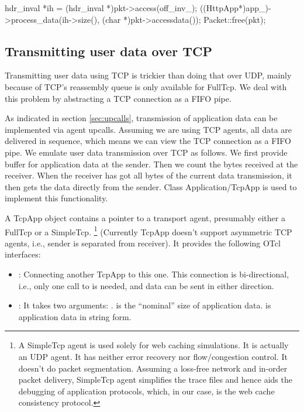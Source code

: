 \begin{program}
        hdr_inval *ih = (hdr_inval *)pkt->access(off_inv_);
        ((HttpApp*)app_)->process_data(ih->size(), (char *)pkt->accessdata());
        Packet::free(pkt);
\end{program}


\subsection{Transmitting user data over TCP}
\label{sec:webcache-tcpapp}

Transmitting user data using TCP is trickier than doing that over UDP,
mainly because of TCP's reassembly queue is only available for
FullTcp. We deal with this problem by abstracting a TCP connection as
a FIFO pipe. 

As indicated in section \ref{sec:upcalls}, transmission of application data
can be implemented via agent upcalls. Assuming we are using TCP agents, 
all data are delivered in sequence, which means we can view the TCP 
connection as a FIFO pipe. We emulate user data transmission over TCP
as follows. We first provide buffer 
for application data at the sender. Then we count the bytes received at the 
receiver. When the receiver has got all bytes of the current data transmission,
it then gets the data directly from the sender. Class Application/TcpApp is 
used to implement this functionality.

A TcpApp object contains a pointer to a transport agent, presumably either
a FullTcp or a SimpleTcp.
\footnote{A SimpleTcp agent is used solely for web caching simulations. It 
is actually an UDP agent. It has neither error recovery nor flow/congestion
control. It doesn't do packet segmentation. Assuming a loss-free network 
and in-order packet delivery,
SimpleTcp agent simplifies the trace files 
and hence aids the debugging of application protocols, which, in our case, 
is the web cache consistency protocol.}
(Currently TcpApp doesn't support asymmetric TCP agents, i.e., sender is
separated from receiver). It provides the following OTcl interfaces:

\begin{itemize}
\item {}: Connecting another TcpApp to this one. This
  connection is bi-directional, i.e., only one call to  is 
  needed, and data can be sent in either direction. 
\item {}: It takes two arguments: .
   is the ``nominal'' size of application data.  
  is application data in string form.
\end{itemize}

